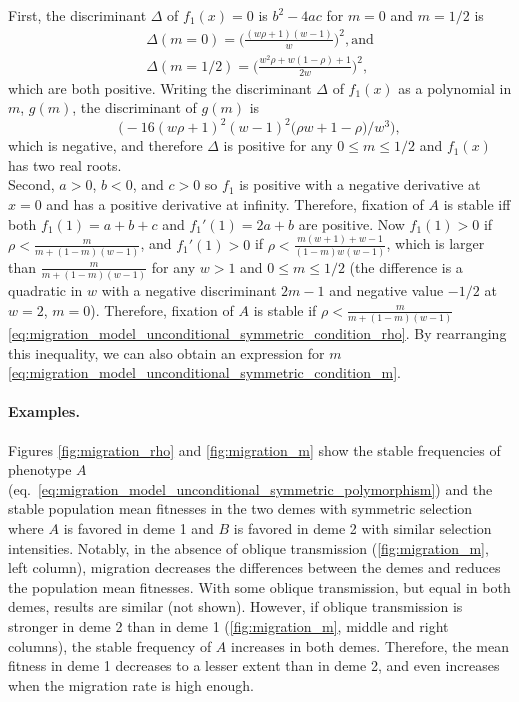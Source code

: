 \documentclass[14pt]{extarticle}
\begin{document}
First, the discriminant $\Delta$ of $f_1(x)=0$ is $b^2-4ac$ for $m=0$ and $m=1/2$ is
\begin{equation}\begin{aligned}
\Delta(m=0) = \Big(\frac{(w \rho + 1) (w-1)}{w}\Big)^2, \text{and} \\
\Delta(m=1/2) = \Big(\frac{w^2 \rho + w(1-\rho) + 1}{2 w}\Big)^2,
\end{aligned}\end{equation}
which are both positive. 
Writing the discriminant $\Delta$ of $f_1(x)$ as a polynomial in $m$, $g(m)$, the discriminant of $g(m)$ is
$$
\big(- 16 (w\rho + 1)^2 (w - 1)^2 \big(\rho w + 1 - \rho \big) / w^3\big),
$$
which is negative, and therefore $\Delta$ is positive for any $0 \le m \le 1/2$ and $f_1(x)$ has two real roots. \\
Second, $a>0$, $b<0$, and $c>0$ so $f_1$ is positive with a negative derivative at $x=0$ and has a positive derivative at infinity.
Therefore, fixation of $A$ is stable iff both $f_1(1)=a+b+c$ and $f_1'(1)=2a+b$ are positive.
Now $f_1(1)>0$  if $\rho < \frac{m}{m+(1-m)(w-1)}$, and
$f_1'(1)>0$  if $\rho < \frac{m(w+1)+w-1}{(1-m)w(w-1)}$, which is larger than $\frac{m}{m+(1-m)(w-1)}$ for any $w>1$ and $0 \le m \le 1/2$ (the difference is a quadratic in $w$ with a negative discriminant $2m-1$ and negative value $-1/2$ at $w=2$, $m=0$). 
Therefore, fixation of $A$ is stable if $\rho < \frac{m}{m+(1-m)(w-1)}$ \eqref{eq:migration_model_unconditional_symmetric_condition_rho}. By rearranging this inequality, we can also obtain an expression for $m$ \eqref{eq:migration_model_unconditional_symmetric_condition_m}.

\paragraph{Examples.}

Figures \ref{fig:migration_rho} and \ref{fig:migration_m} show the stable frequencies of phenotype $A$~ (eq.~\ref{eq:migration_model_unconditional_symmetric_polymorphism}) and the stable population mean fitnesses in the two demes with symmetric selection where $A$ is favored in deme 1 and $B$ is favored in deme 2 with similar selection intensities.
Notably, in the absence of oblique transmission (\autoref{fig:migration_m}, left column), migration decreases the differences between the demes and reduces the population mean fitnesses.
With some oblique transmission, but equal in both demes, results are similar (not shown).
However, if oblique transmission is stronger in deme 2 than in deme 1 (\autoref{fig:migration_m}, middle and right columns), the stable frequency of $A$ increases in both demes.
Therefore, the mean fitness in deme 1 decreases to a lesser extent than in deme 2, and even increases when the migration rate is high enough.
\end{document}
